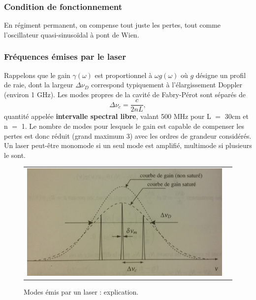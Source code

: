 \documentclass[11pt,a4paper]{report}
\begin{document}
\subsubsection*{Condition de fonctionnement}

En régiment permanent, on compense tout juste les pertes, tout comme l'oscillateur quasi-sinusoïdal à pont de Wien.

\subsubsection*{Fréquences émises par le laser}

Rappelons que le gain $\gamma(\omega)$ est proportionnel à $\omega g(\omega)$ où $g$ désigne un profil de raie, dont la largeur $\Delta \nu_D$ correspond typiquement à l'élargissement Doppler (environ 1 GHz). Les modes propres de la cavité de Fabry-Pérot sont séparés de
\begin{equation}
	\Delta \nu_c = \frac{c}{2nL},
\end{equation}
quantité appelée \textbf{intervalle spectral libre}, valant 500 MHz pour L $=$ 30cm et n $=$ 1. Le nombre de modes pour lesquels le gain est capable de compenser les pertes est donc réduit (grand maximum 3) avec les ordres de grandeur considérés. Un laser peut-être monomode si un seul mode est amplifié, multimode si plusieurs le sont.\\

\begin{figure}[h!]
\begin{center}
	\begin{tabular}{cc}
		\includegraphics[scale = 0.45]{final.png}
	\end{tabular}
\end{center}
\caption{Modes émis par un laser : explication.}
\end{figure}
\end{document}
